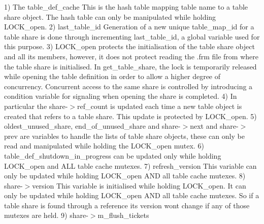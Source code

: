 1) The table\+\_\+def\+\_\+cache This is the hash table mapping table name to a table share object. The hash table can only be manipulated while holding L\+O\+C\+K\+\_\+open. 2) last\+\_\+table\+\_\+id Generation of a new unique table\+\_\+map\+\_\+id for a table share is done through incrementing last\+\_\+table\+\_\+id, a global variable used for this purpose. 3) L\+O\+C\+K\+\_\+open protects the initialisation of the table share object and all its members, however, it does not protect reading the .frm file from where the table share is initialised. In get\+\_\+table\+\_\+share, the lock is temporarily released while opening the table definition in order to allow a higher degree of concurrency. Concurrent access to the same share is controlled by introducing a condition variable for signaling when opening the share is completed. 4) In particular the share-\/$>$ref\+\_\+count is updated each time a new table object is created that refers to a table share. This update is protected by L\+O\+C\+K\+\_\+open. 5) oldest\+\_\+unused\+\_\+share, end\+\_\+of\+\_\+unused\+\_\+share and share-\/$>$next and share-\/$>$prev are variables to handle the lists of table share objects, these can only be read and manipulated while holding the L\+O\+C\+K\+\_\+open mutex. 6) table\+\_\+def\+\_\+shutdown\+\_\+in\+\_\+progress can be updated only while holding L\+O\+C\+K\+\_\+open and A\+LL table cache mutexes. 7) refresh\+\_\+version This variable can only be updated while holding L\+O\+C\+K\+\_\+open A\+ND all table cache mutexes. 8) share-\/$>$version This variable is initialised while holding L\+O\+C\+K\+\_\+open. It can only be updated while holding L\+O\+C\+K\+\_\+open A\+ND all table cache mutexes. So if a table share is found through a reference its version won\textquotesingle{}t change if any of those mutexes are held. 9) share-\/$>$m\+\_\+flush\+\_\+tickets 